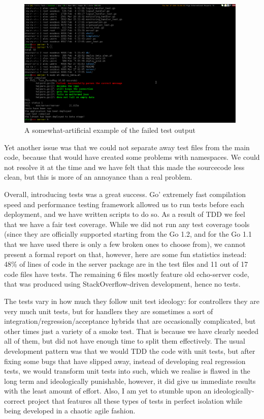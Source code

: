\documentclass{l3proj}
\begin{document}
\begin{figure}[H]
\centering
\includegraphics[width=110mm]{images/test.png}
\caption{A somewhat-artificial example of the failed test output}
\label{fig:FailedTest}
\end{figure}

Yet another issue was that we could not separate away test files from the main code, because that would have created some problems with namespaces. We could not resolve it at the time and we have felt that this made the sourcecode less clean, but this is more of an annoyance than a real problem.

Overall, introducing tests was a great success. Go' extremely fast compilation speed and performance testing framework allowed us to run tests before each deployment, and we have written scripts to do so. As a result of TDD we feel that we have a fair test coverage. While we did not run any test coverage tools (since they are officially supported starting from the Go 1.2, and for the Go 1.1 that we have used there is only a few broken ones to choose from), we cannot present a formal report on that, however, here are some fun statistics instead: 48\% of lines of code in the server package are in the test files and 11 out of 17 code files have tests. The remaining 6 files mostly feature old echo-server code, that was produced using StackOverflow-driven development, hence no tests. 

The tests vary in how much they follow unit test ideology: for controllers they are very much unit tests, but for handlers they are sometimes a sort of integration/regression/acceptance hybrids that are occasionally complicated, but other times just a variety of a smoke test. That is because we have clearly needed all of them, but did not have enough time to split them effectively. The usual development pattern was that we would TDD the code with unit tests, but after fixing some bugs that have slipped away, instead of developing real regression tests, we would transform unit tests into such, which we realise is flawed in the long term and ideologically punishable, however, it did give us immediate results with the least amount of effort. Also, I am yet to stumble upon an ideologically-correct project that features all these types of tests in perfect isolation while being developed in a chaotic agile fashion.
\end{document}
